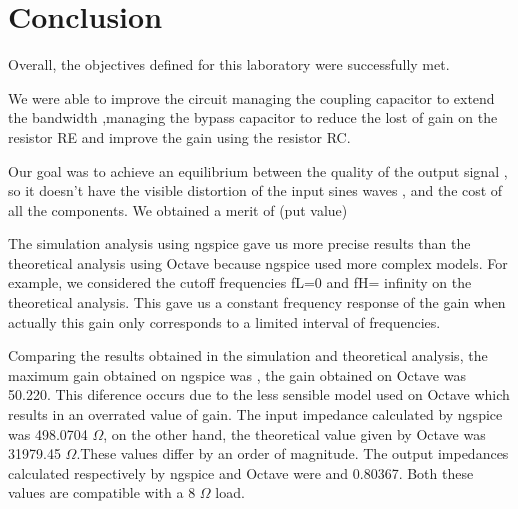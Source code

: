 \section{Conclusion}
\label{sec:conclusion}

Overall, the objectives defined for this laboratory were successfully met.

We were able to improve the circuit managing the coupling capacitor to extend the bandwidth ,managing the bypass capacitor to reduce the lost of gain on the resistor RE and improve the gain using the resistor RC.

Our goal was to achieve an equilibrium between the quality of the output signal , so it doesn't have the visible distortion of the input sines waves , and the cost of all the components. We obtained a merit of (put value)  

The simulation analysis using ngspice  gave us more precise results than the theoretical analysis using Octave because ngspice used more complex models. For example, we considered the cutoff frequencies fL=0 and fH= infinity on the theoretical analysis. This gave us a constant frequency response of the gain when actually this gain only corresponds to a limited interval of frequencies. 

Comparing the results obtained in the simulation and theoretical analysis, the maximum gain obtained on ngspice was , the gain obtained on Octave was 50.220. This diference occurs due to the less sensible model used on Octave which results  in an overrated value of gain. 
The input impedance calculated by ngspice was 498.0704 $\Omega$, on the other hand, the theoretical value  given by Octave was 31979.45 $\Omega$.These values differ by an order of magnitude. The output impedances calculated respectively by ngspice and Octave were  and 0.80367. Both these values are compatible with a 8 $\Omega$ load. 
